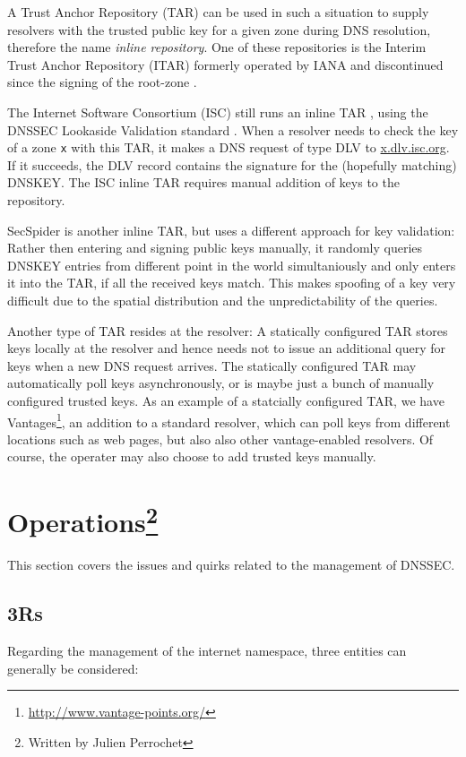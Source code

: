 \documentclass[a4paper,twocolumn]{scrartcl}
\newcommand{\wbjp}{\protect\footnote{Written by Julien Perrochet}}
\begin{document}
A Trust Anchor Repository (TAR) can be used in such a situation to
supply resolvers with the trusted public key for a given zone during
DNS resolution, therefore the name \emph{inline repository}. One of
these repositories is the Interim Trust Anchor Repository (ITAR)
formerly operated by IANA and discontinued since the signing of the
root-zone \cite{itar}.

The Internet Software Consortium (ISC) still runs an inline TAR
\cite{iscDlv}, using the DNSSEC Lookaside Validation standard
\cite{RFC5074}. When a resolver needs to check the key of a zone
\verb|x| with this TAR, it makes a DNS request of type DLV to
\url{x.dlv.isc.org}. If it succeeds, the DLV record contains the
signature for the (hopefully matching) DNSKEY. The ISC inline TAR
requires manual addition of keys to the repository.

SecSpider \cite{secspider, Osterweil09} is another inline TAR, but
uses a different approach for key validation: Rather then entering and
signing public keys manually, it randomly queries DNSKEY entries from
different point in the world simultaniously and only enters it into
the TAR, if all the received keys match. This makes spoofing of a key
very difficult due to the spatial distribution and the
unpredictability of the queries.

Another type of TAR resides at the resolver: A statically configured
TAR stores keys locally at the resolver and hence needs not to issue an
additional query for keys when a new DNS request arrives. The
statically configured TAR may automatically poll keys asynchronously,
or is maybe just a bunch of manually configured trusted keys. As an
example of a statcially configured TAR, we have
Vantages\footnote{\url{http://www.vantage-points.org/}}, an addition
to a standard resolver, \cite{Osterweil09} which can poll keys from
different locations such as web pages, but also also other
vantage-enabled resolvers. Of course, the operater may also choose to
add trusted keys manually.

\section{Operations\wbjp}
This section covers the issues and quirks related to the management of DNSSEC.
\subsection{3Rs}
Regarding the management of the internet namespace, three entities can generally be considered:
\end{document}
